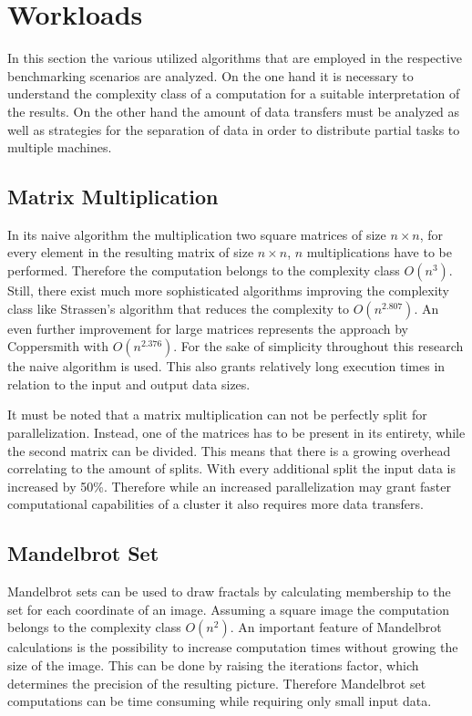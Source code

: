 \section{Workloads}
\label{workload_explanation}
In this section the various utilized algorithms that are employed in the respective benchmarking scenarios are analyzed. On the one hand it is necessary to understand the complexity class of a computation for a suitable interpretation of the results. On the other hand the amount of data transfers must be analyzed as well as strategies for the separation of data in order to distribute partial tasks to multiple machines.

\subsection*{Matrix Multiplication}
\label{matrix_multiplication_workload}
In its naive algorithm the multiplication two square matrices of size $n\times n$, for every element in the resulting matrix of size $n\times n$, $n$ multiplications have to be performed. Therefore the computation belongs to the complexity class $O(n^3)$. Still, there exist much more sophisticated algorithms improving the complexity class like Strassen's algorithm that reduces the complexity to $O(n^{2.807})$\cite{strassen}. An even further improvement for large matrices represents the approach by Coppersmith with $O(n^{2.376})$\cite{coppersmith}. For the sake of simplicity throughout this research the naive algorithm is used. This also grants relatively long execution times in relation to the input and output data sizes.

It must be noted that a matrix multiplication can not be perfectly split for parallelization. Instead, one of the matrices has to be present in its entirety, while the second matrix can be divided. This means that there is a growing overhead correlating to the amount of splits. With every additional split the input data is increased by 50\%. Therefore while an increased parallelization may grant faster computational capabilities of a cluster it also requires more data transfers.

\subsection*{Mandelbrot Set}

Mandelbrot sets can be used to draw fractals by calculating membership to the set for each coordinate of an image. Assuming a square image the computation belongs to the complexity class $O(n^2)$. An important feature of Mandelbrot calculations is the possibility to increase computation times without growing the size of the image. This can be done by raising the iterations factor, which determines the precision of the resulting picture. Therefore Mandelbrot set computations can be time consuming while requiring only small input data.

